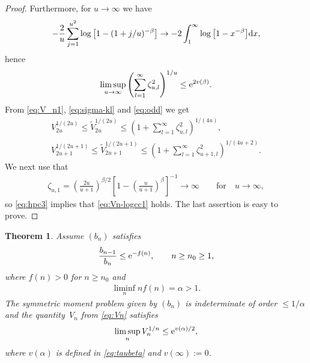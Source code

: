 \documentclass[pdftex]{sigma}
\numberwithin{equation}{section}
\newtheorem{thm}{Theorem}[section]
\begin{document}
\begin{proof}
Furthermore, for $u\to\infty$ we have
\begin{gather*}
-\frac{2}{u}\sum_{j=1}^{u^2} \log\big[1-(1+j/u)^{-\beta}\big]\to -2 \int_1^\infty \log\big[1-x^{-\beta}\big]{\rm d}x,
\end{gather*}
hence
\begin{gather}\label{eq:hpc3}
\limsup_{u\to\infty}\left(\sum_{l=1}^\infty \zeta_{u,l}^2\right)^{1/u} \le {\rm e}^{2v(\beta)}.
\end{gather}
From \eqref{eq:V_n1}, \eqref{eq:sigma-kl} and \eqref{eq:odd} we get
\begin{gather*}
V_{2u}^{1/(2u)} \le \tilde{V}_{2u}^{1/(2u)}\le \left(1+\sum_{l=1}^\infty \zeta_{u,l}^2\right)^{1/(4u)},\\
V_{2u+1}^{1/(2u+1)} \le \tilde{V}_{2u+1}^{1/(2u+1)}\le \left(1+\sum_{l=1}^\infty \zeta_{u+1,l}^2\right)^{1/(4u+2)}.
\end{gather*}
We next use that
\begin{gather*}
\zeta_{u,1}=\left(\frac{2u}{u+1}\right)^{\beta/2}\left[1-\left(\frac{u}{u+1}\right)^\beta\right]^{-1}\to \infty \qquad \text{for}\quad u\to\infty,
\end{gather*}
so \eqref{eq:hpc3} implies that \eqref{eq:Vn-logcc1} holds. The last assertion is easy to prove.
\end{proof}

\begin{thm}\label{thm:thm2b} Assume $(b_n)$ satisfies
\begin{gather*}
\frac{b_{n-1}}{b_n}\le {\rm e}^{-f(n)},\qquad n\ge n_0\ge 1,
\end{gather*}
where $f(n)>0$ for $n\ge n_0$ and
\begin{gather*}
\liminf_{n} nf(n)=\alpha>1.
\end{gather*}
The symmetric moment problem given by $(b_n)$ is indeterminate of order $\le 1/\alpha$ and the quanti\-ty~$V_n$ from \eqref{eq:Vn} satisfies
\begin{gather}\label{eq:rootVn1}
\limsup_n V_n^{1/n}\le {\rm e}^{v(\alpha)/2},
\end{gather}
where $v(\alpha)$ is defined in \eqref{eq:taubeta} and $v(\infty):=0$.
\end{thm}
\end{document}
